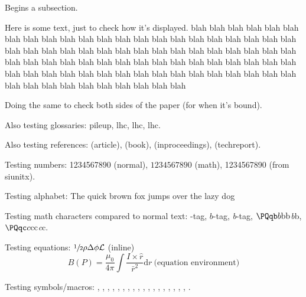 Begins a subsection.


\newpage

Here is some text, just to check how it's displayed. blah blah blah blah blah blah blah blah blah blah blah blah blah blah blah blah blah blah blah blah blah blah blah blah blah blah blah blah blah blah blah blah blah blah blah blah blah blah blah blah blah blah blah blah blah blah blah blah blah blah blah blah blah blah blah blah blah blah blah blah blah blah blah blah blah blah blah blah blah blah blah blah blah blah blah blah blah blah blah blah 

\newpage

Doing the same to check both sides of the paper (for when it's bound).

Also testing glossaries: \gls{pileup}, \acrlong{lhc}, \acrshort{lhc}, \acrfull{lhc}.

Also testing references: \cite{CMS-PAPER-SUS-15-005-published} (article), \cite{tagkey1984quarksandleptons} (book), \cite{Lisanti:2016jxe} (inproceedings), \cite{CMS-PAS-HIG-18-008} (techreport).

Testing numbers: 1234567890 (normal), $1234567890$ (math), \si{1234567890} (from siunitx).

Testing alphabet: The quick brown fox jumps over the lazy dog

Testing math characters compared to normal text: \Pqb-tag, $b$-tag, \emph{b}-tag, $\Pqb b\mathrm{b}\text{b}$\emph{b}b, $\Pqc c\mathrm{c}\text{c}$\emph{c}c.

Testing equations: $\sfrac{1}{2} \rho \Delta \phi \mathcal{L}$ (inline)
\begin{equation}
B(P) = \frac{\mu_0}{4\pi} \int \frac{I \times \hat{r}}{\bar{r}^2}\mathrm{d}r \ \text{(equation environment)}
\end{equation}

Testing symbols/macros: \eV, \MeV, \GeV, \TeV, \pt, \ptmiss, \met, \HT, \mht, \mt, \aDark, \rinv, \mqdark, \doubleMuCr, \doubleLepMass, \alphat, \ttbarpjets, \wtolnupjets, \LSP.

